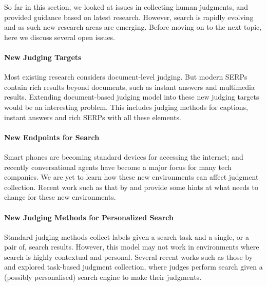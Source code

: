 So far in this section, we looked at issues in collecting human judgments, and provided guidance based on latest research. However, search is rapidly evolving and as such new research areas are emerging. Before moving on to the next topic, here we discuss several open issues.

\paragraph{New Judging Targets} Most existing research considers document-level judging. But modern SERPs contain rich results beyond documents, such as instant answers and multimedia results. Extending document-based judging model into these new judging targets would be an interesting problem. This includes judging methods for captions, instant answers and rich SERPs with all these elements.

\paragraph{New Endpoints for Search} Smart phones are becoming standard devices for accessing the internet; and recently conversational agents have become a major focus for many tech companies. We are yet to learn how these new environments can affect judgment collection. Recent work such as that by \cite{VermaY16} and \cite{Kiseleva:2016} provide some hints at what needs to change for these new environments.

\paragraph{New Judging Methods for Personalized Search} Standard judging methods collect labels given a search task and a single, or a pair of, search results. However, this model may not work in environments where search is highly contextual and personal. Several recent works such as  those by \cite{Moraveji:2011} and \cite{Xu:2009} explored task-based judgment collection, where judges perform search given a (possibly personalised) search engine to make their judgments.
